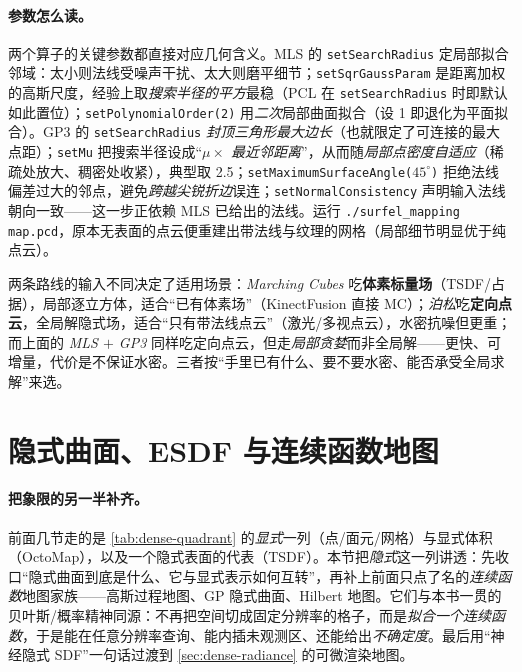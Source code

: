 \paragraph{参数怎么读。}
两个算子的关键参数都直接对应几何含义。MLS 的 \texttt{setSearchRadius} 定局部拟合邻域：太小则法线受噪声干扰、太大则磨平细节；\texttt{setSqrGaussParam} 是距离加权的高斯尺度，经验上取\emph{搜索半径的平方}最稳（PCL 在 \texttt{setSearchRadius} 时即默认如此置位）；\texttt{setPolynomialOrder(2)} 用\emph{二次}局部曲面拟合（设 1 即退化为平面拟合）。GP3 的 \texttt{setSearchRadius} \emph{封顶三角形最大边长}（也就限定了可连接的最大点距）；\texttt{setMu} 把搜索半径设成“\emph{$\mu\times$ 最近邻距离}”，从而随\emph{局部点密度自适应}（稀疏处放大、稠密处收紧），典型取 2.5；\texttt{setMaximumSurfaceAngle($45^\circ$)} 拒绝法线偏差过大的邻点，避免\emph{跨越尖锐折边}误连；\texttt{setNormalConsistency} 声明输入法线朝向一致——这一步正依赖 MLS 已给出的法线。运行 \texttt{./surfel\_mapping map.pcd}，原本无表面的点云便重建出带法线与纹理的网格（局部细节明显优于纯点云）。

\begin{insight}
两条路线的输入不同决定了适用场景：\emph{Marching Cubes} 吃\textbf{体素标量场}（TSDF/占据），局部逐立方体，适合“已有体素场”（KinectFusion 直接 MC）；\emph{泊松}吃\textbf{定向点云}，全局解隐式场，适合“只有带法线点云”（激光/多视点云），水密抗噪但更重；而上面的 \emph{MLS $+$ GP3} 同样吃定向点云，但走\emph{局部贪婪}而非全局解——更快、可增量，代价是不保证水密。三者按“手里已有什么、要不要水密、能否承受全局求解”来选。
\end{insight}

\section{隐式曲面、ESDF 与连续函数地图}
\label{sec:dense-implicit}

\paragraph{把象限的另一半补齐。}
前面几节走的是 \cref{tab:dense-quadrant} 的\emph{显式}一列（点/面元/网格）与显式体积（OctoMap），以及一个隐式表面的代表（TSDF）。本节把\emph{隐式}这一列讲透：先收口“隐式曲面到底是什么、它与显式表示如何互转”，再补上前面只点了名的\emph{连续函数}地图家族——高斯过程地图、GP 隐式曲面、Hilbert 地图。它们与本书一贯的贝叶斯/概率精神同源：不再把空间切成固定分辨率的格子，而是\emph{拟合一个连续函数}，于是能在任意分辨率查询、能内插未观测区、还能给出\emph{不确定度}。最后用“神经隐式 SDF”一句话过渡到 \cref{sec:dense-radiance} 的可微渲染地图。

